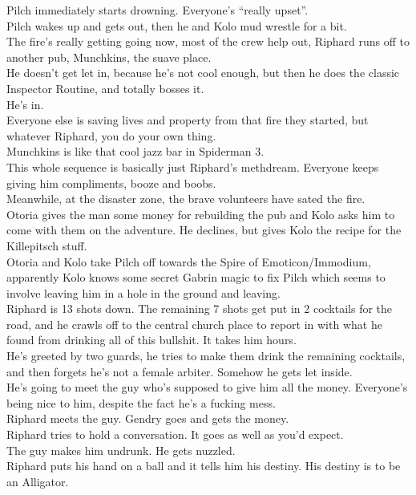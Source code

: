 Pilch immediately starts drowning. Everyone’s “really upset”.\\
Pilch wakes up and gets out, then he and Kolo mud wrestle for a bit.\\
The fire’s really getting going now, most of the crew help out, Riphard runs off to another pub, Munchkins, the suave place.\\
He doesn’t get let in, because he’s not cool enough, but then he does the classic Inspector Routine, and totally bosses it.\\
He’s in.\\
Everyone else is saving lives and property from that fire they started, but whatever Riphard, you do your own thing.\\
Munchkins is like that cool jazz bar in Spiderman 3.\\
This whole sequence is basically just Riphard’s methdream. Everyone keeps giving him compliments, booze and boobs.\\
Meanwhile, at the disaster zone, the brave volunteers have sated the fire.\\
Otoria gives the man some money for rebuilding the pub and Kolo asks him to come with them on the adventure. He declines, but gives Kolo the recipe for the Killepitsch stuff.\\
Otoria and Kolo take Pilch off towards the Spire of Emoticon/Immodium, apparently Kolo knows some secret Gabrin magic to fix Pilch which seems to involve leaving him in a hole in the ground and leaving.\\
Riphard is 13 shots down. The remaining 7 shots get put in 2 cocktails for the road, and he crawls off to the central church place to report in with what he found from drinking all of this bullshit. It takes him hours.\\
He’s greeted by two guards, he tries to make them drink the remaining cocktails, and then forgets he’s not a female arbiter. Somehow he gets let inside.\\
He’s going to meet the guy who’s supposed to give him all the money. Everyone’s being nice to him, despite the fact he’s a fucking mess.\\
Riphard meets the guy. Gendry goes and gets the money.\\
Riphard tries to hold a conversation. It goes as well as you’d expect.\\
The guy makes him undrunk. He gets nuzzled.\\
Riphard puts his hand on a ball and it tells him his destiny. His destiny is to be an Alligator.\\
